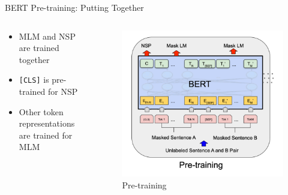 \documentclass[serif, aspectratio=169]{beamer}
\begin{document}
\begin{frame}{BERT Pre-training: Putting Together}
    \begin{columns}
        \begin{column}{0.5\textwidth} %
            \begin{itemize}
                \item MLM and NSP are trained together
                \item \texttt{[CLS]} is pre-trained for NSP
                \item Other token representations are trained for MLM
            \end{itemize}
        \end{column}
        
        \begin{column}{0.5\textwidth}
            \begin{figure}
                \centering
                \includegraphics[width=\textwidth]{Figures/BERT-pretraining.png} %
                \caption*{Pre-training}
            \end{figure}
        \end{column}
    \end{columns}
\end{frame}
\end{document}
